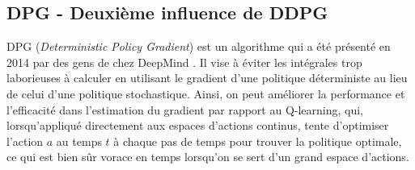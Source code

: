 \documentclass[letterpaper, french]{article}
\begin{document}
\subsection{DPG - Deuxième influence de DDPG}
DPG (\textit{Deterministic Policy Gradient}) est un algorithme qui a été présenté en 2014 par des gens de chez DeepMind \cite{silver2014deterministic}. Il vise à éviter les intégrales trop laborieuses à calculer en utilisant le gradient d'une politique déterministe au lieu de celui d'une politique stochastique. Ainsi, on peut améliorer la performance et l'efficacité dans l'estimation du gradient par rapport au Q-learning, qui, lorsqu'appliqué directement aux espaces d'actions continus, tente d'optimiser l'action $a$ au temps $t$ à chaque pas de temps pour trouver la politique optimale, ce qui est bien sûr vorace en temps lorsqu'on se sert d'un grand espace d'actions.\\
\end{document}
